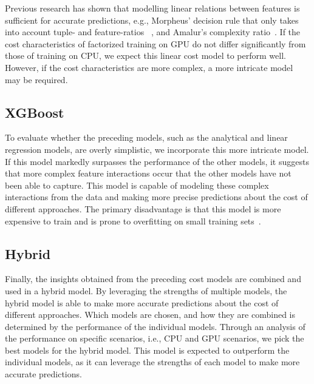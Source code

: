 Previous research has shown that modelling linear relations between features is sufficient for accurate predictions, e.g., Morpheus' decision rule that only takes into account tuple- and feature-ratios ~\cite{morpheus}, and Amalur's complexity ratio~\cite{amalur}. If the cost characteristics of factorized training on GPU do not differ significantly from those of training on CPU, we expect this linear cost model to perform well. However, if the cost characteristics are more complex, a more intricate model may be required.

\subsection{XGBoost}
To evaluate whether the preceding models, such as the analytical and linear regression models, are overly simplistic, we incorporate this more intricate model. If this model markedly surpasses the performance of the other models, it suggests that more complex feature interactions occur that the other models have not been able to capture. This model is capable of modeling these complex interactions from the data and making more precise predictions about the cost of different approaches. The primary disadvantage is that this model is more expensive to train and is prone to overfitting on small training sets~\cite{xgboost}.

\subsection{Hybrid}
Finally, the insights obtained from the preceding cost models are combined and used in a hybrid model. By leveraging the strengths of multiple models, the hybrid model is able to make more accurate predictions about the cost of different approaches. Which models are chosen, and how they are combined is determined by the performance of the individual models. Through an analysis of the performance on specific scenarios, i.e., CPU and GPU scenarios, we pick the best models for the hybrid model. This model is expected to outperform the individual models, as it can leverage the strengths of each model to make more accurate predictions.
